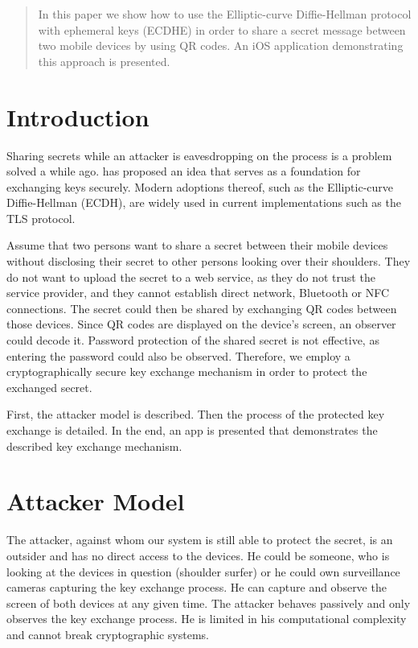 \begin{abstract}
	In this paper we show how to use the Elliptic-curve Diffie-Hellman protocol with ephemeral keys (ECDHE) in order to share a secret message between two mobile devices by using QR codes.
	An iOS application demonstrating this approach is presented.
\end{abstract}


\section{Introduction}

Sharing secrets while an attacker is eavesdropping on the process is a problem solved a while ago.
\textcite{DBLP:journals/cacm/Merkle78} has proposed an idea that serves as a foundation for exchanging keys securely.
Modern adoptions thereof, such as the Elliptic-curve Diffie-Hellman (ECDH), are widely used in current implementations such as the TLS protocol.

Assume that two persons want to share a secret between their mobile devices without disclosing their secret to other persons looking over their shoulders.
They do not want to upload the secret to a web service, as they do not trust the service provider, and they cannot establish direct network, Bluetooth or NFC connections.
The secret could then be shared by exchanging QR codes between those devices.
Since QR codes are displayed on the device's screen, an observer could decode it.
Password protection of the shared secret is not effective, as entering the password could also be observed.
Therefore, we employ a cryptographically secure key exchange mechanism in order to protect the exchanged secret.

First, the attacker model is described.
Then the process of the protected key exchange is detailed.
In the end, an app is presented that demonstrates the described key exchange mechanism.


\section{Attacker Model}

The attacker, against whom our system is still able to protect the secret, is an outsider and has no direct access to the devices.
He could be someone, who is looking at the devices in question (shoulder surfer) or he could own surveillance cameras capturing the key exchange process.
He can capture and observe the screen of both devices at any given time.
The attacker behaves passively and only observes the key exchange process.
He is limited in his computational complexity and cannot break cryptographic systems.

